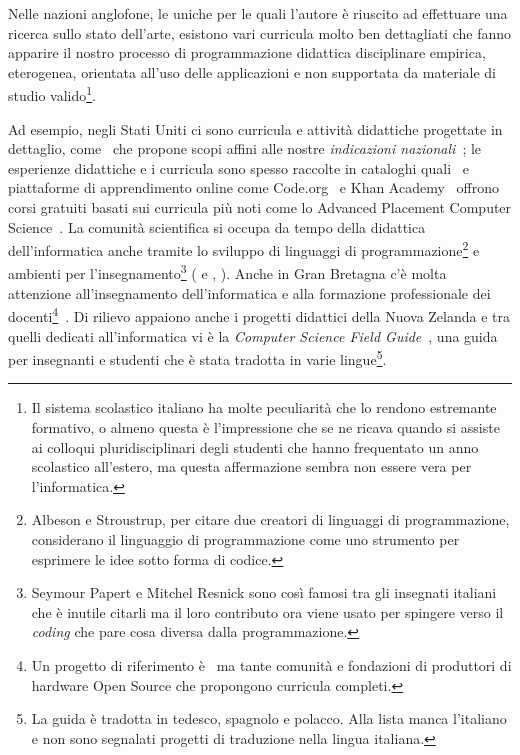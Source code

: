 \documentclass[a4paper]{easychair}
\begin{document}
Nelle nazioni anglofone, le uniche per le quali l'autore è riuscito ad effettuare
una ricerca sullo stato dell'arte, esistono vari curricula molto ben dettagliati
che fanno apparire il nostro processo di programmazione didattica disciplinare
empirica, eterogenea, orientata all'uso delle applicazioni e non supportata da
materiale di studio valido\footnote{%
Il sistema scolastico italiano ha molte peculiarità che lo rendono estremante formativo,
o almeno questa è l'impressione che se ne ricava quando si assiste ai colloqui pluridisciplinari
degli studenti che hanno frequentato un anno scolastico all'estero,
ma questa affermazione sembra non essere vera per l'informatica.}.



Ad esempio, negli Stati Uniti ci sono curricula e attività didattiche progettate in
dettaglio, come~\cite{Fisler2021} che propone scopi affini
alle nostre \textit{indicazioni nazionali}~\cite{IlMinistro2010}; le esperienze didattiche e i curricula sono
spesso raccolte in cataloghi quali~\cite{cs4all} e piattaforme di apprendimento online come Code.org~\cite{codeorg}
e Khan Academy~\cite{khan-academy} offrono corsi gratuiti basati sui curricula più noti
come lo Advanced Placement Computer Science~\cite{ap-csp}.
La comunità scientifica si occupa da tempo della didattica dell'informatica anche tramite lo sviluppo
di linguaggi di programmazione\footnote{Albeson e Stroustrup, per citare due creatori di linguaggi di programmazione, considerano il linguaggio di programmazione come uno strumento per esprimere le idee sotto forma di codice.} e ambienti per l'insegnamento\footnote{%
Seymour Papert e Mitchel Resnick sono così famosi tra gli insegnati italiani che è inutile citarli ma il loro contributo ora viene usato per spingere verso il \textit{coding} che pare cosa diversa dalla programmazione.} %
(\cite{Abelson1996} e \cite{Abelson2022}, \cite{Felleisen2018}). 
Anche in Gran Bretagna c'è molta attenzione all'insegnamento dell'informatica
e alla formazione professionale dei docenti\footnote{Un progetto di riferimento è~\cite{nc4ce} ma tante comunità e fondazioni
di produttori di hardware Open Source che propongono curricula completi.
}~\cite{Fowler2021}.
Di rilievo appaiono anche i progetti didattici della Nuova Zelanda e tra quelli dedicati all'informatica
vi è la \textit{Computer Science Field Guide}~\cite{UniComputerScienceEducationResearchGroupCanterbury2023},
una guida per insegnanti e studenti che è stata tradotta in varie lingue\footnote{La guida è tradotta in tedesco, spagnolo e polacco. Alla lista manca l'italiano e non sono segnalati progetti di traduzione nella lingua italiana.}.
\end{document}
